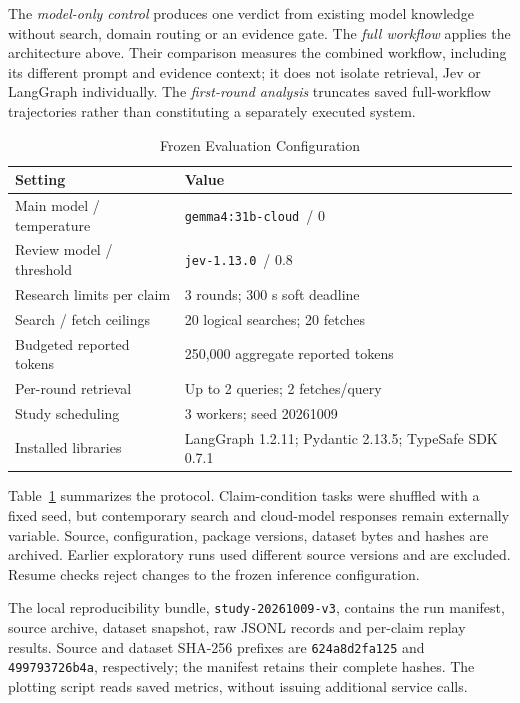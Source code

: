 \documentclass[conference]{IEEEtran}
\newcommand{\modelname}{\texttt{gemma4:31b-cloud}}
\newcommand{\jevname}{\texttt{jev-1.13.0}}
\begin{document}
The \emph{model-only control} produces one verdict from existing model knowledge without search, domain routing or an evidence gate. The \emph{full workflow} applies the architecture above. Their comparison measures the combined workflow, including its different prompt and evidence context; it does not isolate retrieval, Jev or LangGraph individually. The \emph{first-round analysis} truncates saved full-workflow trajectories rather than constituting a separately executed system.

\begin{table}[t]
\caption{Frozen Evaluation Configuration}
\label{tab:protocol}
\centering
\footnotesize
\begin{tabular}{@{}p{}p{}@{}}
\toprule
Setting & Value\\
\midrule
Main model / temperature & \modelname\ / 0\\
Review model / threshold & \jevname\ / 0.8\\
Research limits per claim & 3 rounds; 300 s soft deadline\\
Search / fetch ceilings & 20 logical searches; 20 fetches\\
Budgeted reported tokens & 250,000 aggregate reported tokens\\
Per-round retrieval & Up to 2 queries; 2 fetches/query\\
Study scheduling & 3 workers; seed 20261009\\
Installed libraries & LangGraph 1.2.11; Pydantic 2.13.5; TypeSafe SDK 0.7.1\\
\bottomrule
\end{tabular}
\end{table}

Table~\ref{tab:protocol} summarizes the protocol. Claim-condition tasks were shuffled with a fixed seed, but contemporary search and cloud-model responses remain externally variable. Source, configuration, package versions, dataset bytes and hashes are archived. Earlier exploratory runs used different source versions and are excluded. Resume checks reject changes to the frozen inference configuration.

The local reproducibility bundle, \texttt{study-20261009-v3}, contains the run manifest, source archive, dataset snapshot, raw JSONL records and per-claim replay results. Source and dataset SHA-256 prefixes are \texttt{624a8d2fa125} and \texttt{499793726b4a}, respectively; the manifest retains their complete hashes. The plotting script reads saved metrics, without issuing additional service calls.
\end{document}
